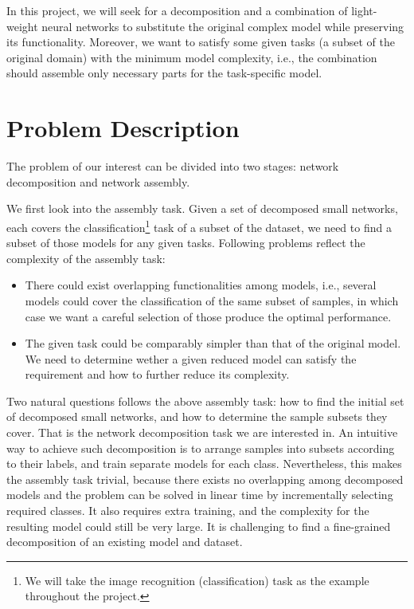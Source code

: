 \documentclass[acmsmall,nonacm]{acmart}\settopmatter{}
\begin{document}
In this project, we will seek for a decomposition and a combination of light-weight neural networks to substitute the original complex model while preserving its functionality.
Moreover, we want to satisfy some given tasks (a subset of the original domain) with the minimum model complexity, i.e., the combination should assemble only necessary parts for the task-specific model.

\section{Problem Description}
\label{sec:problem-desc}
The problem of our interest can be divided into two stages: network decomposition and network assembly.

We first look into the assembly task.
Given a set of decomposed small networks, each covers the classification\footnote{We will take the image recognition (classification) task as the example throughout the project.} task of a subset of the dataset, we need to find a subset of those models for any given tasks.
Following problems reflect the complexity of the assembly task:\begin{itemize}
  \item There could exist overlapping functionalities among models, i.e., several models could cover the classification of the same subset of samples, in which case we want a careful selection of those produce the optimal performance.
  \item The given task could be comparably simpler than that of the original model. We need to determine wether a given reduced model can satisfy the requirement and how to further reduce its complexity.
\end{itemize}

Two natural questions follows the above assembly task: how to find the initial set of decomposed small networks, and how to determine the sample subsets they cover.
That is the network decomposition task we are interested in.
An intuitive way to achieve such decomposition is to arrange samples into subsets according to their labels, and train separate models for each class.
Nevertheless, this makes the assembly task trivial, because there exists no overlapping among decomposed models and the problem can be solved in linear time by incrementally selecting required classes.
It also requires extra training, and the complexity for the resulting model could still be very large.
It is challenging to find a fine-grained decomposition of an existing model and dataset.
\end{document}
